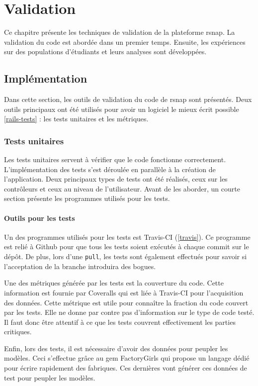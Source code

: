 \chapter{Validation}
Ce chapitre présente les techniques de validation de la plateforme \gls{rsnap}. La validation du code est abordée dans un premier temps. Ensuite, les expériences sur des populations d'étudiants et leurs analyses sont développées.

\section{Implémentation}
Dans cette section, les outils de validation du code de \gls{rsnap} sont présentés. Deux outils principaux ont été utilisés pour avoir un logiciel le mieux écrit possible \ref{rails-tests} : les tests unitaires et les métriques.

\subsection{Tests unitaires}
Les tests unitaires servent à vérifier que le code fonctionne correctement. L'implémentation des tests s'est déroulée en parallèle à la création de l'application. Deux principaux types de tests ont été réalisés, ceux sur les contrôleurs et ceux au niveau de l'utilisateur. Avant de les aborder, un courte section présente les programmes utilisés pour les tests.

\subsubsection{Outils pour les tests}
Un des programmes utilisés pour les tests est Travis-CI (\ref{travis}). Ce programme est relié à Github pour que tous les tests soient exécutés à chaque commit sur le dépôt. De plus, lors d'une \texttt{\gls{pull}}, les tests sont également effectués pour savoir si l'acceptation de la branche introduira des bogues.

Une des métriques générée par les tests est la couverture du code. Cette information est fournie par Coveralls\cite{coveralls} qui est liée à Travis-CI pour l'acquisition des données. Cette métrique est utile pour connaître la fraction du code couvert par les tests. Elle ne donne par contre pas d'information sur le type de code testé. Il faut donc être attentif à ce que les tests couvrent effectivement les parties critiques.

Enfin, lors des tests, il est nécessaire d'avoir des données pour peupler les modèles. Ceci s'effectue grâce au \gls{gem} FactoryGirls \cite{factorygirls} qui propose un langage dédié pour écrire rapidement des fabriques. Ces dernières vont générer ces données de test pour peupler les modèles.

